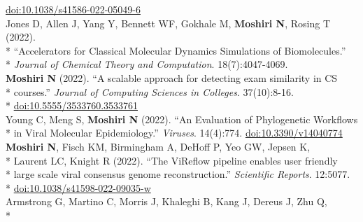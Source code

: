 \documentclass[margin,line]{res}
\begin{document}
\begin{resume}
\hspace*{8mm} \href{https://doi.org/10.1038/s41586-022-05049-6}{doi:10.1038/s41586-022-05049-6}\\
\hspace*{4mm} Jones D, Allen J, Yang Y, Bennett WF, Gokhale M, \textbf{Moshiri N}, Rosing T (2022).\\*
\hspace*{9mm} ``Accelerators for Classical Molecular Dynamics Simulations of Biomolecules.''\\*\vspace{2mm}
\hspace*{8mm} \textit{Journal of Chemical Theory and Computation}. 18(7):4047-4069.\\
\hspace*{4mm} \textbf{Moshiri N} (2022). ``A scalable approach for detecting exam similarity in CS\\*
\hspace*{9mm} courses.'' \textit{Journal of Computing Sciences in Colleges}. 37(10):8-16.\\*\vspace{2mm}
\hspace*{8mm} \href{https://dl.acm.org/doi/abs/10.5555/3533760.3533761}{doi:10.5555/3533760.3533761}\\
\hspace*{4mm} Young C, Meng S, \textbf{Moshiri N} (2022). ``An Evaluation of Phylogenetic Workflows\\*\vspace{2mm}
\hspace*{8mm} in Viral Molecular Epidemiology.'' \textit{Viruses}. 14(4):774. \href{https://doi.org/10.3390/v14040774}{doi:10.3390/v14040774}\\
\hspace*{4mm} \textbf{Moshiri N}, Fisch KM, Birmingham A, DeHoff P, Yeo GW, Jepsen K,\\*
\hspace*{9mm} Laurent LC, Knight R (2022). ``The ViReflow pipeline enables user friendly\\*
\hspace*{9mm} large scale viral consensus genome reconstruction.'' \textit{Scientific Reports}. 12:5077.\\*\vspace{2mm}
\hspace*{8mm} \href{https://doi.org/10.1038/s41598-022-09035-w}{doi:10.1038/s41598-022-09035-w}\\
\hspace*{4mm} Armstrong G, Martino C, Morris J, Khaleghi B, Kang J, Dereus J, Zhu Q,\\*

\end{resume}
\end{document}
